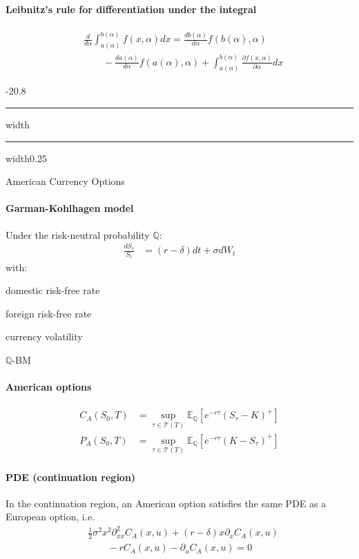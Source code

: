 \documentclass[a4paper,landscape,8pt,fleqn]{scrartcl}
\makeatletter
\renewcommand{\section}{\@startsection{section}{1}{0mm}%
{-2\baselineskip}{0.8\baselineskip}%
{\hrule depth 0.2pt width\columnwidth\hrule depth1.5pt
width0.25\columnwidth\vspace*{1.2em}\Large\bfseries}}
\makeatother
\begin{document}
\begin{multicols*}{4}
\paragraph{Leibnitz's rule for differentiation under the integral}
\begin{align*}
&\frac{d}{d\alpha} \int_{a(\alpha)}^{b(\alpha)} f(x,\alpha) dx = \frac{db(\alpha)}{d\alpha} f(b(\alpha),\alpha)\\
&\qquad - \frac{da(\alpha)}{d\alpha} f(a(\alpha),\alpha) + \int_{a(\alpha)}^{b(\alpha)} \frac{\partial f(x,\alpha)}{\partial \alpha} dx
\end{align*}

\section{American Currency Options}

\paragraph{Garman-Kohlhagen model}
Under the risk-neutral probability $\mathbb{Q}$:
\begin{align*}
\frac{dS_t}{S_t} &= (r-\delta) dt + \sigma dW_t
\end{align*}
with:
\begin{multicols}{2}
\begin{description}[style=multiline,leftmargin=0.5cm]
\item[$r$] domestic risk-free rate
\item[$\delta$] foreign risk-free rate
\item[$\sigma$] currency volatility
\item[$W_t$] $\mathbb{Q}$-BM
\end{description}
\end{multicols}

\paragraph{American options}
\begin{align*}
C_A(S_0,T) &= \sup_{\tau \in \mathcal{T}(T)} \mathbb{E}_\mathbb{Q} \left[ e^{-r \tau} (S_\tau - K)^+ \right] \\
P_A(S_0,T) &= \sup_{\tau \in \mathcal{T}(T)} \mathbb{E}_\mathbb{Q} \left[ e^{-r \tau} (K - S_\tau)^+ \right]
\end{align*}

\paragraph{PDE (continuation region)}
In the continuation region, an American option satisfies the same PDE as a European option, i.e.
\begin{align*}
& \frac{1}{2} \sigma^2 x^2 \partial^2_{xx} C_A(x,u) + (r-\delta) x \partial_x C_A(x,u) \\
& \qquad - r C_A(x,u) - \partial_u C_A(x,u) = 0
\end{align*}


\end{multicols*}
\end{document}
